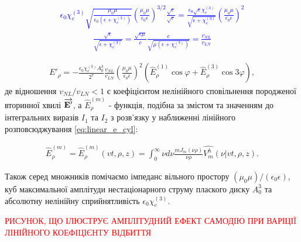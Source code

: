 \textcolor{blue} { \begin{equation*} \begin{aligned}
\epsilon_0 \chi_e^{(3)}
\sqrt{\frac{\mu_0 \mu}{\epsilon_0 \left( \epsilon + \chi_e^{(3)} \right)}} 
\left( \frac{\mu_0 \mu}{\epsilon_0 \epsilon} \right)^{3/2} 
\frac{\sqrt{\epsilon}}{\sqrt{\epsilon}} =
\frac{\epsilon_0 \sqrt{\epsilon} \chi_e^{(3)}}
{\sqrt{\epsilon + \chi_e^{(3)}}} 
\left( \frac{\mu_0 \mu}{\epsilon_0 \epsilon} \right)^2
\end{aligned} \end{equation*} }
%
\textcolor{blue} { \begin{equation*} \begin{aligned}
\frac{\sqrt{\epsilon}}
{\sqrt{\epsilon + \chi_e^{(3)}}} =
\frac{\sqrt{\epsilon \mu}}{c} 
\frac{c}{\sqrt{\mu \left( \epsilon + \chi_e^{(3)} \right)}} = 
\frac{v_{NL}}{v_{LN}}
\end{aligned} \end{equation*} }

\begin{equation} \begin{aligned} \label{eq:erho_kerr}
E'_\rho = - \frac{\epsilon_0 \chi_e^{(3)} A_0^3}{2^7}
\frac{v_{NL}}{v_{LN}}
\left( \frac{\mu_0 \mu}{\epsilon_0 \epsilon} \right)^2
\left(\hat{E}_\rho^{(1)} \cos \varphi +
\hat{E}_\rho^{(3)} \cos 3 \varphi \right),
\end{aligned} \end{equation}
%
де відношення $ v_{NL} / v_{LN} < 1 $ є коефіцієнтом нелінійного 
сповільнення породженої вторинної хвилі $ \overrightarrow{\mathbf E'} $, а 
$ \hat{E}_\rho^{(m)} $ - функція, подібна за змістом та значенням до 
інтегральних виразів $ I_1 $ та $ I_2 $ з розв'язку у наближенні
лінійного розповсюджування \eqref{eq:linear_e_cyl}:

\begin{equation} \begin{aligned} \label{eq:erho_norm}
\hat{E}_\rho^{(m)} = \hat{E}_\rho^{(m)} (vt,\rho,z) = 
\int_0^\infty \nu d \nu \frac{m J_m(\nu \rho)}{\nu \rho} 
\hat{V_m^h} (\nu | vt,\rho,z).
\end{aligned} \end{equation}

Також серед множників помічаємо імпеданс вільного простору 
$ (\mu_0 \mu) / (\epsilon_0 \epsilon) $, куб максимальної амплітуди 
нестаціонарного струму плаского диску $ A_0^3 $ та абсолютну нелінійну 
сприйнятливість $ \epsilon_0 \chi_e^{(3)} $.

\textcolor{red}{РИСУНОК, ЩО ІЛЮСТРУЄ АМПЛІТУДНИЙ ЕФЕКТ САМОДІЮ ПРИ ВАРІЦІЇ 
ЛІНІЙНОГО КОЕФІЦІЄНТУ ВІДБИТТЯ}

